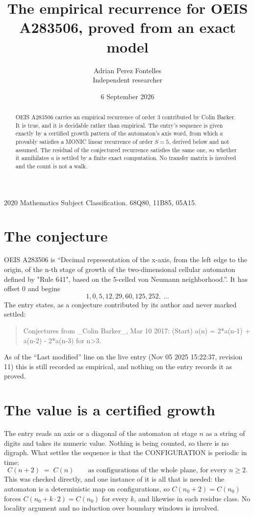 \documentclass[11pt,a4paper]{article}
\title{The empirical recurrence for OEIS A283506, proved from an exact model}
\author{Adrian Perez Fontelles\\ \small Independent researcher}
\date{6 September 2026}
\theoremstyle{plain}
\theoremstyle{definition}
\begin{document}
\maketitle

\begin{abstract}
OEIS A283506 carries an empirical recurrence of order $3$ contributed by Colin Barker. It is true, and it is
decidable rather than empirical. The entry's sequence is given exactly by a certified growth pattern of the automaton's axis word, from
which $a$ provably satisfies a MONIC linear recurrence of order $S=5$, derived below and not
assumed. The residual of the conjectured recurrence satisfies the same one, so whether it
annihilates $a$ is settled by a finite exact computation. No transfer matrix is involved and
the count is not a walk.
\end{abstract}

\noindent\small 2020 Mathematics Subject Classification. 68Q80, 11B85, 05A15.\normalsize

\section{The conjecture}

OEIS A283506 is ``Decimal representation of the x-axis, from the left edge to the origin, of the n-th stage of growth of the two-dimensional cellular automaton defined by "Rule 641", based on the 5-celled von Neumann neighborhood.''. It has offset $0$ and begins
\[
1, 0, 5, 12, 29, 60, 125, 252,\ \dots
\]
The entry states, as a conjecture contributed by its author and never marked settled:
\begin{quote}
Conjectures from \_Colin Barker\_, Mar 10 2017: (Start) a(n) = 2*a(n-1) + a(n-2) - 2*a(n-3) for n>3.
\end{quote}
As of the ``Last modified'' line on the live entry (Nov 05 2025 15:22:37, revision 11)
this is still recorded as empirical, and nothing on the entry records it as proved.

\section{The value is a certified growth}

The entry reads an axis or a diagonal of the automaton at stage $n$ as a string of digits and
takes its numeric value. Nothing is being counted, so there is no digraph. What settles the
sequence is that the CONFIGURATION is periodic in time:
\[
C(n+2)\;=\;C(n)\qquad\text{as configurations of the whole plane, for every } n\ge 2.
\]
This was checked directly, and one instance of it is all that is needed: the automaton is a
deterministic map on configurations, so $C(n_0+2)=C(n_0)$ forces $C(n_0+k\cdot2)=C(n_0)$ for
every $k$, and likewise in each residue class. No locality argument and no induction over
boundary windows is involved.
\end{document}
